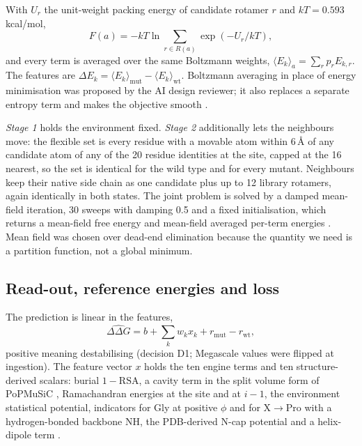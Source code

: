 \documentclass[unnumsec,webpdf,contemporary,large]{oup-authoring-template}
\begin{document}
With $U_r$ the unit-weight packing energy of candidate rotamer $r$ and $kT = 0.593$ kcal/mol,
\begin{equation}
F(a) = -kT \ln \sum_{r \in R(a)} \exp\!\left(-U_r / kT\right),
\label{eq:boltz}
\end{equation}
and every term is averaged over the same Boltzmann weights, $\langle E_k \rangle_a = \sum_r p_r E_{k,r}$. The
features are $\Delta E_k = \langle E_k\rangle_{\mathrm{mut}} - \langle E_k\rangle_{\mathrm{wt}}$. Boltzmann
averaging in place of energy minimisation was proposed by the AI design reviewer; it also replaces a separate
entropy term and makes the objective smooth \citep{koehl1994}.

\emph{Stage 1} holds the environment fixed. \emph{Stage 2} additionally lets the neighbours move: the flexible
set is every residue with a movable atom within 6\,\AA{} of any candidate atom of any of the 20 residue
identities at the site, capped at the 16 nearest, so the set is identical for the wild type and for every
mutant. Neighbours keep their native side chain as one candidate plus up to 12 library rotamers, again
identically in both states. The joint problem is solved by a damped mean-field iteration, 30 sweeps with damping
0.5 and a fixed initialisation, which returns a mean-field free energy and mean-field averaged per-term energies
\citep{koehl1994,kamisetty2008}. Mean field was chosen over dead-end elimination because the quantity we need
is a partition function, not a global minimum.

\subsection{Read-out, reference energies and loss}

The prediction is linear in the features,
\begin{equation}
\widehat{\Delta\Delta G} = b + \sum_k w_k x_k + r_{\mathrm{mut}} - r_{\mathrm{wt}},
\label{eq:readout}
\end{equation}
positive meaning destabilising (decision D1; Megascale values were flipped at ingestion). The feature vector $x$
holds the ten engine terms and ten structure-derived scalars: burial $1-\mathrm{RSA}$, a cavity term in the split
volume form of PoPMuSiC \citep{dehouck2009}, Ramachandran energies at the site and at $i-1$, the
environment statistical potential, indicators for Gly at positive $\phi$ and for X$\rightarrow$Pro with a
hydrogen-bonded backbone NH, the PDB-derived N-cap potential \citep{richardson1988} and a helix-dipole term
\citep{hol1978,shoemaker1987}.
\end{document}

